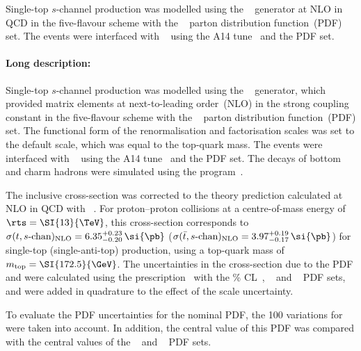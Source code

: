 Single-top $s$-channel production was modelled using the \POWHEGBOX[v2]~\cite{Alioli:2009je,Nason:2004rx,Frixione:2007vw,Alioli:2010xd}
generator at NLO in QCD in the five-flavour scheme with the \NNPDF[3.0nlo]~\cite{Ball:2014uwa} parton distribution function~(PDF) set.
The events were interfaced with \PYTHIA[8.230]~\cite{Sjostrand:2014zea} using the A14 tune~\cite{ATL-PHYS-PUB-2014-021} and the
\NNPDF[2.3lo] PDF set.




\paragraph{Long description:}

Single-top $s$-channel production was modelled using the \POWHEGBOX[v2]~\cite{Alioli:2009je,Nason:2004rx,Frixione:2007vw,Alioli:2010xd}
generator, which provided matrix elements at next-to-leading order~(NLO) in the strong coupling constant \alphas in the 
five-flavour scheme with the \NNPDF[3.0nlo]~\cite{Ball:2014uwa} parton distribution function~(PDF) set.
The functional form of the renormalisation and factorisation scales was set to the default scale, which was equal to the top-quark mass.
The events were interfaced with \PYTHIA[8.230]~\cite{Sjostrand:2014zea} using the A14 tune~\cite{ATL-PHYS-PUB-2014-021} and the
\NNPDF[2.3lo] PDF set.
The decays of bottom and charm hadrons were simulated using the \EVTGEN[1.6.0] program~\cite{Lange:2001uf}.

The inclusive cross-section was corrected to the theory prediction calculated at NLO in QCD with 
\HATHOR[2.1]~\cite{Aliev:2010zk,Kant:2014oha}.
For proton--proton collisions at a centre-of-mass energy of $\rts = \SI{13}{\TeV}$, this cross-section corresponds to
$\sigma(t,s\text{-chan})_{\text{NLO}} = 6.35^{+0.23}_{-0.20}\,\si{\pb}$
($\sigma(\bar{t},s\text{-chan})_{\text{NLO}} = 3.97^{+0.19}_{-0.17}\,\si{\pb}$)
for single-top (single-anti-top) production, using a top-quark mass of $\mtop = \SI{172.5}{\GeV}$.
The uncertainties in the cross-section due to the PDF and \alphas were calculated using the \PDFforLHC prescription~\cite{Butterworth:2015oua}
with the \% CL~\cite{Martin:2009iq,Martin:2009bu}, \CT[10nlo]~\cite{Lai:2010vv} and \NNPDF[2.3nlo]~\cite{Ball:2012cx} PDF sets,
and were added in quadrature to the effect of the scale uncertainty.



To evaluate the PDF uncertainties for the nominal PDF, the 100 variations for \NNPDF[3.0nlo] were taken into account. 
In addition, the central value of this PDF was compared with the central values of the 
\CT[14nnlo]~\cite{Dulat:2015mca} and \MMHT[nnlo]~\cite{Harland-Lang:2014zoa} PDF sets.


